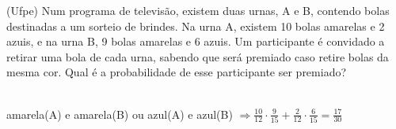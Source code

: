\begin{ex}
(Ufpe) Num programa de televisão, existem duas urnas, A e B, contendo bolas destinadas a um sorteio de brindes. Na urna A, existem 10 bolas amarelas e 2 azuis, e na urna B, 9 bolas amarelas e 6 azuis. Um participante é convidado a retirar uma bola de cada urna, sabendo que será premiado caso retire bolas da mesma cor. Qual é a probabilidade de esse participante ser premiado? 
  \begin{sol}
   \phantom{A}\\
   amarela(A) e amarela(B) ou azul(A) e azul(B) $\Rightarrow \frac{10}{12}\cdot\frac{9}{15}+\frac{2}{12}\cdot\frac{6}{15}=\frac{17}{30}$
  \end{sol}
\end{ex}